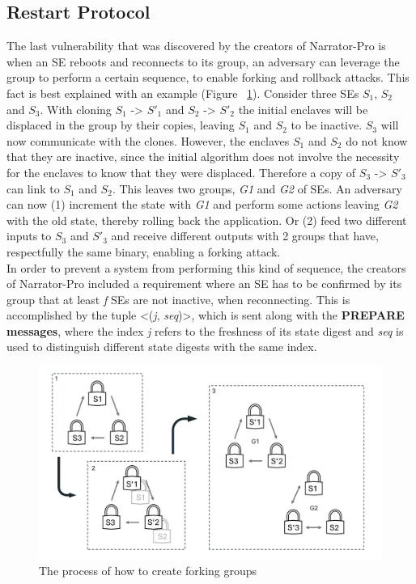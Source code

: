 \subsection{Restart Protocol}
The last vulnerability that was discovered by the creators of Narrator-Pro is when an SE reboots and reconnects to its group, an adversary can leverage the group to perform a certain sequence, to enable forking and rollback attacks. This fact is best explained with an example (Figure  ~\ref{fig:2}). Consider three SEs \(S_{1}\), \(S_{2}\) and \(S_{3}\). With cloning \(S_{1}\) -> \(S'_{1}\) and \(S_{2}\) -> \(S'_{2}\) the initial enclaves will be displaced in the group by their copies, leaving \(S_{1}\) and \(S_{2}\) to be inactive. \(S_{3}\) will now communicate with the clones. However, the enclaves \(S_{1}\) and \(S_{2}\) do not know that they are inactive, since the initial algorithm does not involve the necessity for the enclaves to know that they were displaced. Therefore a copy of \(S_{3}\) -> \(S'_{3}\) can link to \(S_{1}\) and \(S_{2}\). This leaves two groups, \textit{G1} and \textit{G2} of SEs. An adversary can now (1) increment the state with \textit{G1} and perform some actions leaving \textit{G2} with the old state, thereby rolling back the application. Or (2) feed two different inputs to \(S_{3}\) and \(S'_{3}\) and receive different outputs with 2 groups that have, respectfully the same binary, enabling a forking attack.\\
In order to prevent a system from performing this kind of sequence, the creators of Narrator-Pro included a requirement where an SE has to be confirmed by its group that at least \textit{f} SEs are not inactive, when reconnecting. This is accomplished by the tuple <(\textit{j}, \textit{seq})>, which is sent along with the \textbf{PREPARE messages}, where the index \textit{j} refers to the freshness of its state digest and \textit{seq} is used to distinguish different state digests with the same index.\\


\begin{figure}[h]
    \centering
    \includegraphics[width=\linewidth]{Figures/Figure2.png}
    \caption{The process of how to create forking groups}
    \label{fig:2}
\end{figure}